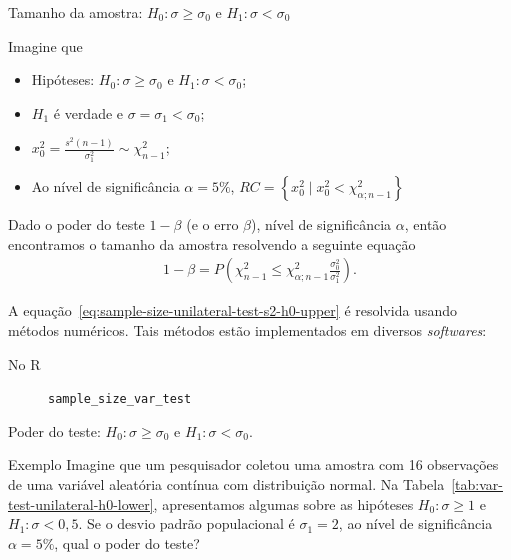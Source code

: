 \documentclass[8pt]{beamer}
\begin{document}
\begin{frame}{Tamanho da amostra: $H_0: \sigma \geq \sigma_0$ e $H_1: \sigma < \sigma_0$}

Imagine que
\begin{itemize}
	\item Hipóteses: $H_0: \sigma \geq \sigma_0$ e $H_1: \sigma < \sigma_0$;
	\item $H_1$ é verdade e $\sigma = \sigma_1 < \sigma_0$;
	\item $x_0^2 = \frac{s^2(n-1)}{\sigma_1^2} \sim \chi_{n-1}^2$;
	\item Ao nível de significância $\alpha=5\%$,  $RC=\left\{ x_0^2 \mid x_0^2 < \chi_{\alpha; n-1}^2 \right\}$
\end{itemize}
\vfill

Dado o poder do teste $1-\beta$ (e o erro $\beta$), nível de significância $\alpha$, então encontramos o tamanho da amostra resolvendo a seguinte equação
\begin{align} \label{eq:sample-size-unilateral-test-s2-h0-upper}
	1-\beta = P \left( \chi_{n-1}^2 \leq \chi_{\alpha; n-1}^2 \frac{\sigma_0^2}{\sigma_1^2} \right).
\end{align}

A equação~\eqref{eq:sample-size-unilateral-test-s2-h0-upper} é resolvida usando métodos numéricos. Tais métodos estão implementados em diversos \textit{softwares}:
\begin{description}
	\item[No R] \texttt{sample\_size\_var\_test}
\end{description}
\end{frame}

\begin{frame}{Poder do teste: $H_0: \sigma \geq \sigma_0$ e $H_1: \sigma < \sigma_0$.}

\large

\begin{block}{Exemplo}
	Imagine que um pesquisador coletou uma amostra com 16 observações de uma variável aleatória contínua com distribuição normal. Na Tabela~\ref{tab:var-test-unilateral-h0-lower}, apresentamos algumas sobre as hipóteses $H_0: \sigma \geq 1$ e $H_1: \sigma < 0,5$. Se o desvio padrão populacional é $\sigma_1 = 2$, ao nível de significância $\alpha=5\%$, qual o poder do teste?
	\begin{table}[ht]
		\centering
		\caption{Algumas informações do experimento.} 
		\label{tab:var-test-unilateral-h0-lower}
	\end{table}
\end{block}
\normalsize

\end{frame}
\end{document}

